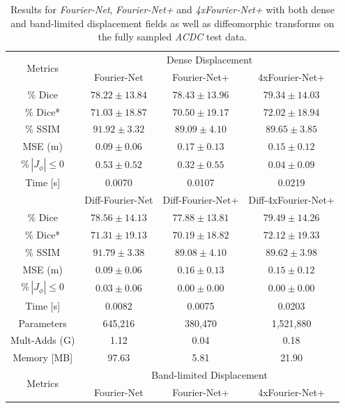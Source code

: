 \begin{table}[H] %
	\centering
	\caption{Results for \emph{Fourier-Net}, \emph{Fourier-Net+} and \emph{4xFourier-Net+} with both dense and band-limited displacement fields as well as diffeomorphic transforms on the fully sampled \emph{ACDC} test data.}
	\label{tab:Fourier-NetvsFourier-Net+ACDC}
	\begin{tabular}{c c c c} %
		\toprule
		\multirow{2}{*}{Metrics} & \multicolumn{3}{c}{Dense Displacement} \\
		\cmidrule(lr){2-4} 
		 & Fourier-Net & Fourier-Net+ & 4xFourier-Net+\\	
		\midrule
		$\%$ Dice & $78.22 \pm 13.84$ & $78.43 \pm 13.96$ & $79.34 \pm 14.03$\\
		$\%$ Dice* & $71.03 \pm 18.87$ & $70.50 \pm 19.17$ & $72.02 \pm 18.94$ \\
		$\%$ SSIM & $91.92 \pm 3.32$ & $89.09 \pm 4.10$ & $89.65 \pm 3.85$\\
		MSE (m) & $0.09 \pm 0.06$ & $0.17 \pm 0.13$ & $0.15 \pm 0.12$ \\
		$\% \, |J_{\phi}|\leq0$ & $0.53 \pm 0.52$ & $0.32 \pm 0.55$ & $0.04 \pm 0.09$ \\
		Time [s] 	  & 0.0070 	& 0.0107 	& 0.0219 \\
		\midrule
		 & Diff-Fourier-Net & Diff-Fourier-Net+ & Diff-4xFourier-Net+\\		
		\midrule
		$\%$ Dice & $78.56 \pm 14.13$ & $77.88 \pm 13.81$ & $79.49 \pm 14.26$\\
		$\%$ Dice* & $71.31 \pm 19.13$ & $70.19 \pm 18.82$ & $72.12 \pm 19.33$ \\
		$\%$ SSIM & $91.79 \pm 3.38$ & $89.08 \pm 4.10$ & $89.62 \pm 3.98$\\
		MSE (m) & $0.09 \pm 0.06$ & $0.16 \pm 0.13$ & $0.15 \pm 0.12$ \\
		$\% \, |J_{\phi}|\leq0$ & $0.03 \pm 0.06$ & $0.00 \pm 0.00$ & $0.00 \pm 0.00$ \\
		Time [s] 	  & 0.0082  & 0.0075 & 0.0203 \\
		\midrule
		Parameters    & 645,216 	& 380,470 	& 1,521,880 \\
		Mult-Adds (G) & 1.12  	& 0.04  		& 0.18 \\
		Memory [MB]   & 97.63   	& 5.81   	& 21.90 \\
		\midrule
		\multirow{2}{*}{Metrics} & \multicolumn{3}{c}{Band-limited Displacement} \\
		\cmidrule(lr){2-4} 
		 & Fourier-Net & Fourier-Net+ & 4xFourier-Net+\\		

\end{tabular}
\end{table}
